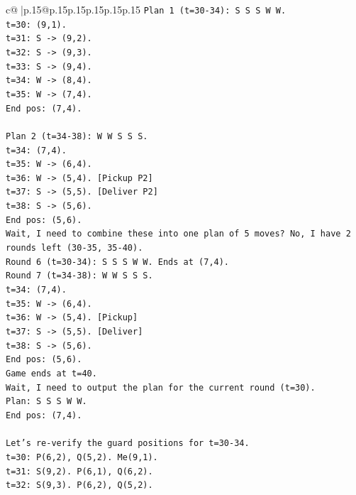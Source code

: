 \documentclass{article}
\begin{document}
{\begin{supertabular}{c@{$\;$}|p{.15\linewidth}@{}p{.15\linewidth}p{.15\linewidth}p{.15\linewidth}p{.15\linewidth}p{.15\linewidth}}
{{{\texttt{Plan 1 (t=30{-}34): S S S W W.} \\
\texttt{t=30: (9,1).} \\
\texttt{t=31: S {-}> (9,2).} \\
\texttt{t=32: S {-}> (9,3).} \\
\texttt{t=33: S {-}> (9,4).} \\
\texttt{t=34: W {-}> (8,4).} \\
\texttt{t=35: W {-}> (7,4).} \\
\texttt{End pos: (7,4).} \\
\\ 
\texttt{Plan 2 (t=34{-}38): W W S S S.} \\
\texttt{t=34: (7,4).} \\
\texttt{t=35: W {-}> (6,4).} \\
\texttt{t=36: W {-}> (5,4). {[}Pickup P2{]}} \\
\texttt{t=37: S {-}> (5,5). {[}Deliver P2{]}} \\
\texttt{t=38: S {-}> (5,6).} \\
\texttt{End pos: (5,6).} \\
\texttt{Wait, I need to combine these into one plan of 5 moves? No, I have 2 rounds left (30{-}35, 35{-}40).} \\
\texttt{Round 6 (t=30{-}34): S S S W W. Ends at (7,4).} \\
\texttt{Round 7 (t=34{-}38): W W S S S.} \\
\texttt{t=34: (7,4).} \\
\texttt{t=35: W {-}> (6,4).} \\
\texttt{t=36: W {-}> (5,4). {[}Pickup{]}} \\
\texttt{t=37: S {-}> (5,5). {[}Deliver{]}} \\
\texttt{t=38: S {-}> (5,6).} \\
\texttt{End pos: (5,6).} \\
\texttt{Game ends at t=40.} \\
\texttt{Wait, I need to output the plan for the current round (t=30).} \\
\texttt{Plan: S S S W W.} \\
\texttt{End pos: (7,4).} \\
\\ 
\texttt{Let's re{-}verify the guard positions for t=30{-}34.} \\
\texttt{t=30: P(6,2), Q(5,2). Me(9,1).} \\
\texttt{t=31: S(9,2). P(6,1), Q(6,2).} \\
\texttt{t=32: S(9,3). P(6,2), Q(5,2).} \\
}}}
\end{supertabular}}
\end{document}
